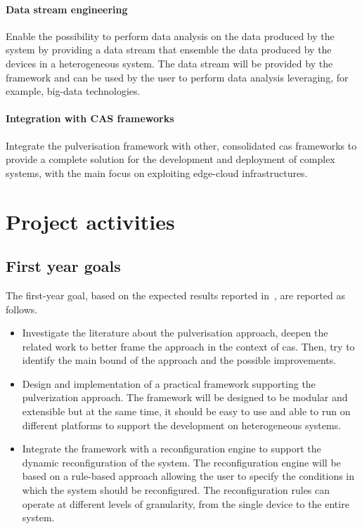 \documentclass[12pt]{article}
\begin{document}
\paragraph{Data stream engineering}
Enable the possibility to perform data analysis on the data produced by the system by providing
a data stream that ensemble the data produced by the devices in a heterogeneous system.
%
The data stream will be provided by the framework and can be used by the user to perform
data analysis leveraging,
for example,
big-data technologies.

\paragraph{Integration with CAS frameworks}
Integrate the pulverisation framework with other, consolidated \ac{cas} frameworks
to provide a complete solution for the development and deployment of complex systems,
with the main focus on exploiting edge-cloud infrastructures.


\section{Project activities}\label{sec:activities}

\subsection{First year goals}\label{subsec:first-year-activities}

The first-year goal,
based on the expected results reported in~,
are reported as follows.

\begin{itemize}
	\item Investigate the literature about the pulverisation approach,
		deepen the related work to better frame the approach in the context of \ac{cas}.
		Then, try to identify the main bound of the approach and the possible improvements.
	\item Design and implementation of a practical framework supporting the pulverization approach.
		The framework will be designed to be modular and extensible but at the same time,
		it should be easy to use and able to run on different platforms to support the development on heterogeneous systems.
	\item Integrate the framework with a reconfiguration engine to support the dynamic reconfiguration of the system.
		The reconfiguration engine will be based on a rule-based approach allowing the user to specify the conditions in which the system should be reconfigured.
		The reconfiguration rules can operate at different levels of granularity,
		from the single device to the entire system.
\end{itemize}
\end{document}
